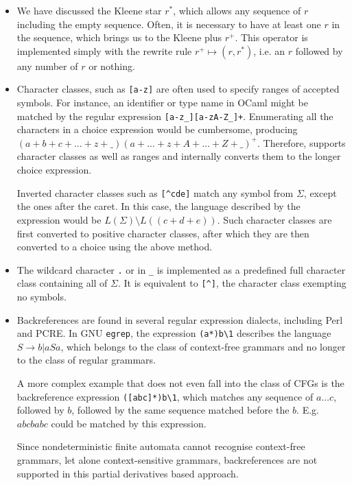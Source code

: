\begin{itemize}

   \item We have discussed the Kleene star $r^*$, which allows any sequence of
      $r$ including the empty sequence. Often, it is necessary to have at least
      one $r$ in the sequence, which brings us to the Kleene plus $r^+$. This
      operator is implemented simply with the rewrite rule $r^+ \mapsto (r,
      r^*)$, i.e. an $r$ followed by any number of $r$ or nothing.

   \item Character classes, such as \verb'[a-z]' are often used to specify
      ranges of accepted symbols. For instance, an identifier or type name in
      OCaml might be matched by the regular expression \verb'[a-z_][a-zA-Z_]+'.
      Enumerating all the characters in a choice expression would be cumbersome,
      producing $(a+b+c+\dots+z+\_)(a+\dots+z+A+\dots+Z+\_)^+$. Therefore,
      \dreml supports character classes as well as ranges and internally
      converts them to the longer choice expression.
      
      Inverted character classes such as \verb'[^cde]' match any symbol from
      $\Sigma$, except the ones after the caret. In this case, the language
      described by the expression would be $L(\Sigma) \setminus L((c+d+e))$.
      Such character classes are first converted to positive character classes,
      after which they are then converted to a choice using the above method.

   \item The wildcard character \verb'.' or in \ocamllex \verb'_' is implemented
      as a predefined full character class containing all of $\Sigma$. It is
      equivalent to \verb'[^]', the character class exempting no symbols.

   \item Backreferences are found in several regular expression dialects,
      including Perl and PCRE. In GNU \texttt{egrep}, the expression
      \verb'(a*)b\1' describes the language $S \to b | a S a$, which belongs to
      the class of context-free grammars and no longer to the class of regular
      grammars.

      A more complex example that does not even fall into the class of CFGs is
      the backreference expression \verb'([abc]*)b\1', which matches any
      sequence of $a \dots c$, followed by $b$, followed by the same sequence
      matched before the $b$. E.g. $abcbabc$ could be matched by this
      expression.

      Since nondeterministic finite automata cannot recognise context-free
      grammars, let alone context-sensitive grammars, backreferences are not
      supported in this partial derivatives based approach.
      
\end{itemize}


